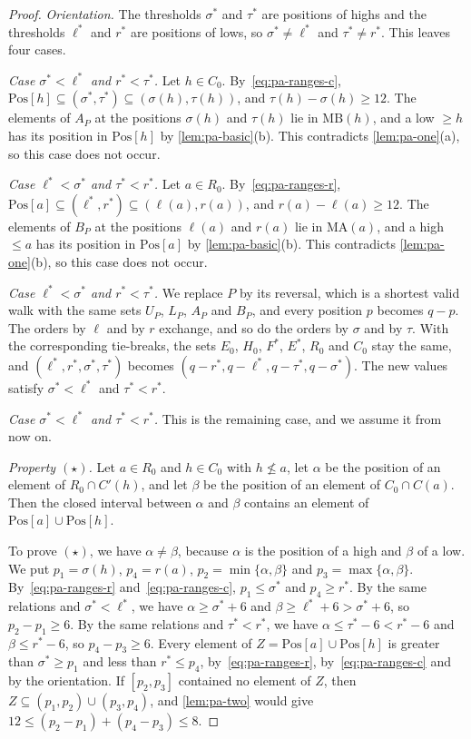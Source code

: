 \documentclass[pdflatex,sn-mathphys-num]{sn-jnl}%
\theoremstyle{thmstyleone}%
\theoremstyle{thmstyletwo}%
\theoremstyle{thmstylethree}%
\newcommand{\MB}{\mathrm{MB}}%
\newcommand{\MA}{\mathrm{MA}}%
\newcommand{\Pos}{\mathrm{Pos}}%
\begin{document}
\begin{proof}
\emph{Orientation.}
The thresholds $\sigma^*$ and $\tau^*$ are positions of highs and the thresholds $\ell^*$ and $r^*$ are positions of lows, so $\sigma^* \neq \ell^*$ and $\tau^* \neq r^*$.
This leaves four cases.

\emph{Case $\sigma^* < \ell^*$ and $r^* < \tau^*$.}
Let $h \in C_0$.
By~\eqref{eq:pa-ranges-c}, $\Pos[h] \subseteq (\sigma^*, \tau^*) \subseteq (\sigma(h), \tau(h))$, and $\tau(h) - \sigma(h) \geq 12$.
The elements of $A_P$ at the positions $\sigma(h)$ and $\tau(h)$ lie in $\MB(h)$, and a low $\geq h$ has its position in $\Pos[h]$ by \cref{lem:pa-basic}(b).
This contradicts \cref{lem:pa-one}(a), so this case does not occur.

\emph{Case $\ell^* < \sigma^*$ and $\tau^* < r^*$.}
Let $a \in R_0$.
By~\eqref{eq:pa-ranges-r}, $\Pos[a] \subseteq (\ell^*, r^*) \subseteq (\ell(a), r(a))$, and $r(a) - \ell(a) \geq 12$.
The elements of $B_P$ at the positions $\ell(a)$ and $r(a)$ lie in $\MA(a)$, and a high $\leq a$ has its position in $\Pos[a]$ by \cref{lem:pa-basic}(b).
This contradicts \cref{lem:pa-one}(b), so this case does not occur.

\emph{Case $\ell^* < \sigma^*$ and $r^* < \tau^*$.}
We replace $P$ by its reversal, which is a shortest valid walk with the same sets $U_P$, $L_P$, $A_P$ and $B_P$, and every position $p$ becomes $q - p$.
The orders by $\ell$ and by $r$ exchange, and so do the orders by $\sigma$ and by $\tau$.
With the corresponding tie-breaks, the sets $E_0$, $H_0$, $F^*$, $E^*$, $R_0$ and $C_0$ stay the same, and $(\ell^*, r^*, \sigma^*, \tau^*)$ becomes $(q - r^*, q - \ell^*, q - \tau^*, q - \sigma^*)$.
The new values satisfy $\sigma^* < \ell^*$ and $\tau^* < r^*$.

\emph{Case $\sigma^* < \ell^*$ and $\tau^* < r^*$.}
This is the remaining case, and we assume it from now on.

\emph{Property $(\star)$.}
Let $a \in R_0$ and $h \in C_0$ with $h \not\leq a$, let $\alpha$ be the position of an element of $R_0 \cap C'(h)$, and let $\beta$ be the position of an element of $C_0 \cap C(a)$.
Then the closed interval between $\alpha$ and $\beta$ contains an element of $\Pos[a] \cup \Pos[h]$.

To prove $(\star)$, we have $\alpha \neq \beta$, because $\alpha$ is the position of a high and $\beta$ of a low.
We put $p_1 = \sigma(h)$, $p_4 = r(a)$, $p_2 = \min\{\alpha, \beta\}$ and $p_3 = \max\{\alpha, \beta\}$.
By~\eqref{eq:pa-ranges-r} and~\eqref{eq:pa-ranges-c}, $p_1 \leq \sigma^*$ and $p_4 \geq r^*$.
By the same relations and $\sigma^* < \ell^*$, we have $\alpha \geq \sigma^* + 6$ and $\beta \geq \ell^* + 6 > \sigma^* + 6$, so $p_2 - p_1 \geq 6$.
By the same relations and $\tau^* < r^*$, we have $\alpha \leq \tau^* - 6 < r^* - 6$ and $\beta \leq r^* - 6$, so $p_4 - p_3 \geq 6$.
Every element of $Z = \Pos[a] \cup \Pos[h]$ is greater than $\sigma^* \geq p_1$ and less than $r^* \leq p_4$, by~\eqref{eq:pa-ranges-r}, by~\eqref{eq:pa-ranges-c} and by the orientation.
If $[p_2, p_3]$ contained no element of $Z$, then $Z \subseteq (p_1, p_2) \cup (p_3, p_4)$, and \cref{lem:pa-two} would give $12 \leq (p_2 - p_1) + (p_4 - p_3) \leq 8$.


\end{proof}
\end{document}
